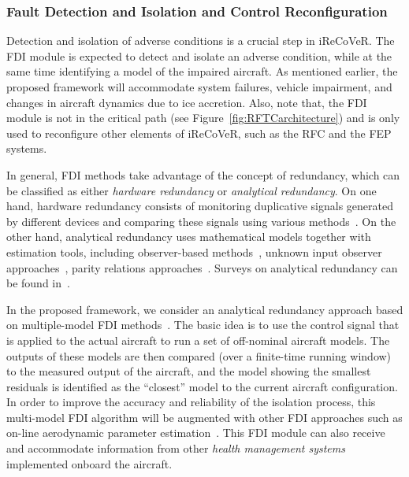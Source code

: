 \documentclass[letter,onecolumn,12pt]{aiaa-tc}
\begin{document}
\subsubsection{Fault Detection and Isolation and Control Reconfiguration}

Detection and isolation of adverse conditions is a crucial step in iReCoVeR. The FDI module is expected to detect and isolate an adverse condition, while at the same time identifying a model of the impaired aircraft. As mentioned earlier, the proposed framework will accommodate system failures, vehicle impairment, and changes in aircraft dynamics due to ice accretion. Also, note that, the FDI module is not in the critical path (see Figure~\ref{fig:RFTCarchitecture}) and is only used to reconfigure other elements of iReCoVeR, such as the RFC and the FEP systems.


In general, FDI methods take advantage of the concept of redundancy, which can be classified as either \emph{hardware redundancy} or \emph{analytical redundancy}. On one hand, hardware redundancy consists of monitoring duplicative signals generated by different devices and comparing these signals using various methods~\cite{nelson1968cross,hfling1995observer}. On the other hand, analytical redundancy uses mathematical models together with estimation tools, including observer-based methods~\cite{patton1991robust,patton2000eigenstructure,beard1971failure,white1987detection,park1994new,park1994new2,douglas1999h}, unknown input observer approaches~\cite{watanabe1982instrument,wunnenberg1987sensor,frank1989robust,chen1996design,demetriou2005using,hou1992design}, parity relations approaches~\cite{gertler1997fault,patton1991robust,patton1994review,chan2006application}.  Surveys on analytical redundancy can be found in~\cite{gertler1988survey,frank1990fault,frank1997survey,hwang2010survey}.


In the proposed framework, we consider an analytical redundancy approach based on multiple-model FDI methods~\cite{cdc99_MMFDI,tcst08_MMFDI}. The basic idea is to use the control signal that is applied to the actual aircraft to run a set of off-nominal aircraft models. The outputs of these models are then compared (over a finite-time running window) to the measured output of the aircraft, and the model showing the smallest residuals is identified as the ``closest'' model to the current aircraft configuration. In order to improve the accuracy and reliability of the isolation process, this multi-model FDI algorithm will be augmented with other FDI approaches such as on-line aerodynamic parameter estimation~\cite{gnc09_FEEP,AFM10_MorelliEstimation}. This FDI module can also receive and accommodate information from other \emph{health management systems} implemented onboard the aircraft.
\end{document}
